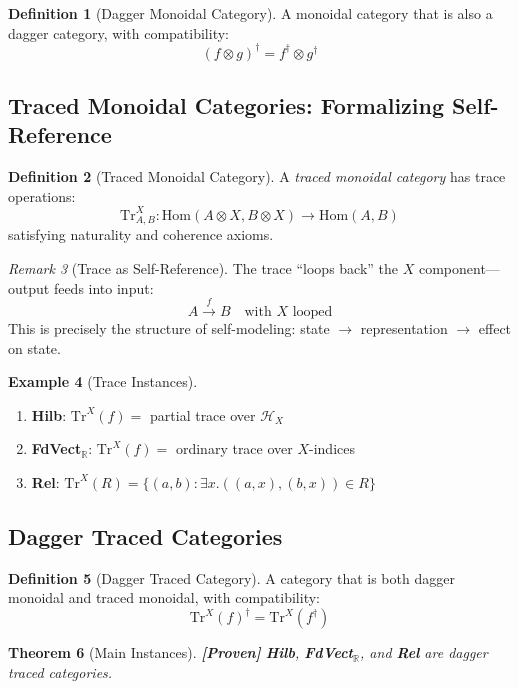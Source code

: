 \documentclass[11pt]{article}
\newtheorem{theorem}{Theorem}[section]
\theoremstyle{definition}
\newtheorem{definition}[theorem]{Definition}
\newtheorem{example}[theorem]{Example}
\theoremstyle{remark}
\newtheorem{remark}[theorem]{Remark}
\begin{document}
\begin{definition}[Dagger Monoidal Category]
A monoidal category that is also a dagger category, with compatibility:
\[
(f \otimes g)^\dagger = f^\dagger \otimes g^\dagger
\]
\end{definition}

\subsection{Traced Monoidal Categories: Formalizing Self-Reference}

\begin{definition}[Traced Monoidal Category]
A \emph{traced monoidal category} has trace operations:
\[
\text{Tr}^X_{A,B} : \text{Hom}(A \otimes X, B \otimes X) \to \text{Hom}(A, B)
\]
satisfying naturality and coherence axioms.
\end{definition}

\begin{remark}[Trace as Self-Reference]
The trace ``loops back'' the $X$ component---output feeds into input:
\[
A \xrightarrow{f} B \quad \text{with } X \text{ looped}
\]
This is precisely the structure of self-modeling: state $\to$ representation $\to$ effect on state.
\end{remark}

\begin{example}[Trace Instances]
\begin{enumerate}
    \item \textbf{Hilb}: $\text{Tr}^X(f) = $ partial trace over $\mathcal{H}_X$
    \item \textbf{FdVect}$_\mathbb{R}$: $\text{Tr}^X(f) = $ ordinary trace over $X$-indices
    \item \textbf{Rel}: $\text{Tr}^X(R) = \{(a,b) : \exists x.((a,x),(b,x)) \in R\}$
\end{enumerate}
\end{example}

\subsection{Dagger Traced Categories}

\begin{definition}[Dagger Traced Category]
A category that is both dagger monoidal and traced monoidal, with compatibility:
\[
\text{Tr}^X(f)^\dagger = \text{Tr}^X(f^\dagger)
\]
\end{definition}

\begin{theorem}[Main Instances]
\textbf{[Proven]} \textbf{Hilb}, \textbf{FdVect}$_\mathbb{R}$, and \textbf{Rel} are dagger traced categories.
\end{theorem}
\end{document}
